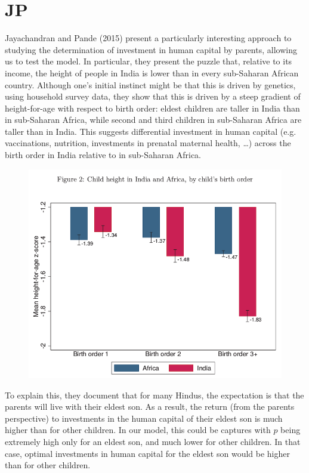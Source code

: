 \documentclass[12pt,english]{article}
\begin{document}
\section{JP}

Jayachandran and Pande (2015) present a particularly interesting approach to studying the determination of investment in human capital by parents, allowing us to test the model. In particular, they present the puzzle that, relative to its income, the height of people in India is lower than in every sub-Saharan African country. Although one's initial instinct might be that this is driven by genetics, using household survey data, they show that this is driven by a steep gradient of height-for-age with respect to birth order: eldest children are taller in India than in sub-Saharan Africa, while second and third children in sub-Saharan Africa are taller than in India. This suggests differential investment in human capital (e.g. vaccinations, nutrition, investments in prenatal maternal health, \ldots) across the birth order in India relative to in sub-Saharan Africa.

\begin{figure}[H]
	\centering
	\begin{adjustbox}{width=\textwidth}
		\includegraphics{fig1.png}
	\end{adjustbox}
\end{figure}

To explain this, they document that for many Hindus, the expectation is that the parents will live with their eldest son. As a result, the return (from the parents perspective) to investments in the human capital of their eldest son is much higher than for other children. In our model, this could be captures with $p$ being extremely high only for an eldest son, and much lower for other children. In that case, optimal investments in human capital for the eldest son would be higher than for other children.
\end{document}
